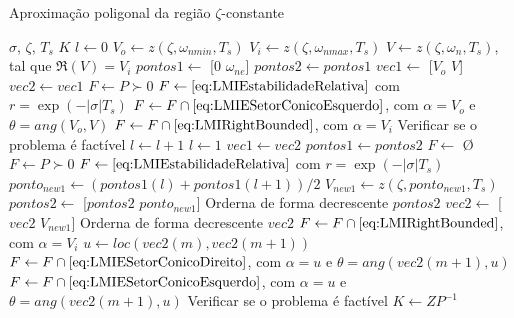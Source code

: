 \begin{algorithm}[ht!]
  \caption{Aproximação poligonal da região $\zeta$-constante}\label{alg:AproximacaoPoligonalZeta}
  \begin{algorithmic}[1]
    \Require $\sigma$, $\zeta$, $T_s$
    \Ensure $K$
    \State $l \gets 0$
    \State $V_o \gets z(\zeta,\omega_{nmin},T_s)$
    \State $V_i \gets z(\zeta,\omega_{nmax},T_s)$
    \State $V \gets z(\zeta,\omega_n,T_s)$, tal que $\Re{(V)} = V_i$
    \State $pontos1 \gets$ [$0$ $\omega_{ne}$]
    \State $pontos2 \gets pontos1$
    \State $vec1 \gets$ [$V_o$ $V$]
    \State $vec2 \gets vec1$
    \State $F \gets P \succ 0$
    \State $F \gets \eqref{eq:LMIEstabilidadeRelativa}$ com $r = \exp{\left(-|\sigma|T_s\right)}$ 
    \State $F \gets F \cap \eqref{eq:LMIESetorConicoEsquerdo}$, com $\alpha = V_o$ e $\theta = ang(V_o,V)$ 
    \State $F \gets F \cap \eqref{eq:LMIRightBounded}$, com $\alpha = V_i$ 
    \State Verificar se o problema é factível
        \State $l \gets l + 1$
      \Else
        \State $l \gets 1$
        \State $vec1 \gets vec2$
        \State $pontos1 \gets pontos2$
      \EndIf
        \State $F \gets$ \O {}
        \State $F \gets P \succ 0$
        \State $F \gets \eqref{eq:LMIEstabilidadeRelativa}$ com $r = \exp{\left(-|\sigma|T_s\right)}$ 
        \State $ponto_{new1} \gets (pontos1(l)+pontos1(l+1))/2$
        \State $V_{new1} \gets z(\zeta, ponto_{new1}, T_s)$
        \State $pontos2 \gets$ [$pontos2$ $ponto_{new1}$]
        \State Orderna de forma decrescente $pontos2$
        \State $vec2 \gets$ [$vec2$ $V_{new1}$]
        \State Orderna de forma decrescente $vec2$
        \State $F \gets F \cap \eqref{eq:LMIRightBounded}$, com $\alpha = V_i$ 
          \State $u \gets loc(vec2(m),vec2(m+1))$
            \State $F\gets F \cap \eqref{eq:LMIESetorConicoDireito}$, com $\alpha = u$ e $\theta = ang(vec2(m+1),u)$ 
          \Else
            \State $F\gets F \cap \eqref{eq:LMIESetorConicoEsquerdo}$, com $\alpha = u$ e $\theta = ang(vec2(m+1),u)$ 
          \EndIf
        \EndFor
        \State Verificar se o problema é factível 
    \EndWhile
    \State $K \gets ZP^{-1}$
  \end{algorithmic}
\end{algorithm}

